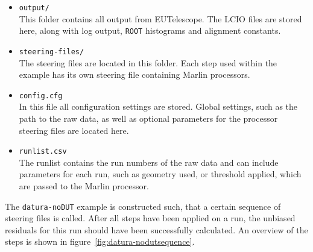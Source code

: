 \begin{itemize}

\item \texttt{output/}\\ This folder contains all output from EUTelescope. The
LCIO files are stored here, along with log output, \texttt{ROOT} histograms and
alignment constants.\\

\item \texttt{steering-files/}\\ The steering files are located in this folder.
Each step used within the example has its own steering file containing Marlin
processors.\\

\item\texttt{config.cfg}\\ In this file all configuration settings are stored.
Global settings, such as the path to the raw data, as well as optional
parameters for the processor steering files are located here.\\

\item \texttt{runlist.csv}\\ The runlist contains the run numbers of the raw
data and can include parameters for each run, such as geometry used, or
threshold applied, which are passed to the Marlin processor.\\

\end{itemize}

The \texttt{datura-noDUT} example is constructed such, that a certain sequence
of steering files is called. After all steps have been applied on a run, the
unbiased residuals for this run should have been successfully calculated. An
overview of the steps is shown in figure~\ref{fig:datura-nodutsequence}.\\

